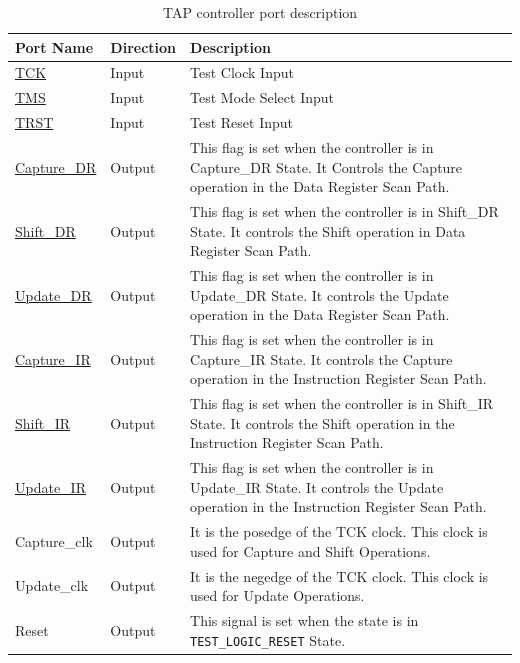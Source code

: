 \begin{longtable}{l l p{9.5cm}}
    \caption{TAP controller port description}
    \label{tab:tap-ports}\\
    \hline
         \textbf{Port Name} & \textbf{Direction} & \textbf{Description}\\ \hline \hline
         \hyperref[subsec:tck]{TCK} & Input & Test Clock Input \\ \hline
         \hyperref[subsec:tms]{TMS} & Input & Test Mode Select Input \\ \hline
         \hyperref[subsec:trst]{TRST} & Input & Test Reset Input \\ \hline
         \hyperref[subsubsec:capture-dr]{Capture\_DR} & Output & This flag is set when the controller is in Capture\_DR State. It Controls the Capture operation in the Data Register Scan Path. \\ \hline
         \hyperref[subsubsec:shift-dr]{Shift\_DR} & Output & This flag is set when the controller is in Shift\_DR State. It controls the Shift operation in Data Register Scan Path. \\ \hline
         \hyperref[subsubsec:update-dr]{Update\_DR} & Output & This flag is set when the controller is in Update\_DR State. It controls the Update operation in the Data Register Scan Path. \\ \hline
         \hyperref[subsubsec:capture-ir]{Capture\_IR} & Output & This flag is set when the controller is in Capture\_IR State. It controls the Capture operation in the Instruction Register Scan Path. \\ \hline
         \hyperref[subsubsec:shift-ir]{Shift\_IR} & Output & This flag is set when the controller is in Shift\_IR State. It controls the Shift operation in the Instruction Register Scan Path. \\ \hline
         \hyperref[subsubsec:update-ir]{Update\_IR} & Output & This flag is set when the controller is in Update\_IR State. It controls the Update operation in the Instruction Register Scan Path. \\ \hline
         Capture\_clk & Output & It is the posedge of the TCK clock. This clock is used for Capture and Shift Operations. \\ \hline
         Update\_clk & Output & It is the negedge of the TCK clock. This clock is used for Update Operations. \\ \hline
         Reset & Output & This signal is set when the state is in \texttt{TEST\_LOGIC\_RESET} State.\\ \hline
\end{longtable}

